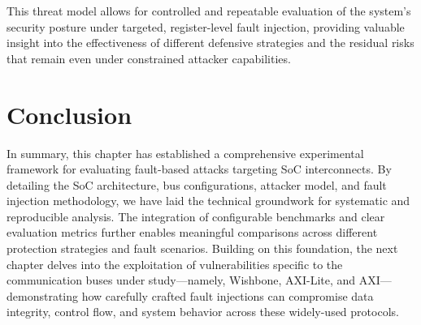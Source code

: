 This threat model allows for controlled and repeatable evaluation of the system’s security posture under targeted, register-level fault injection, providing valuable insight into the effectiveness of different defensive strategies and the residual risks that remain even under constrained attacker capabilities.

\section{Conclusion}
In summary, this chapter has established a comprehensive experimental framework for evaluating fault-based attacks targeting SoC interconnects. By detailing the SoC architecture, bus configurations, attacker model, and fault injection methodology, we have laid the technical groundwork for systematic and reproducible analysis. The integration of configurable benchmarks and clear evaluation metrics further enables meaningful comparisons across different protection strategies and fault scenarios. Building on this foundation, the next chapter delves into the exploitation of vulnerabilities specific to the communication buses under study—namely, Wishbone, AXI-Lite, and AXI—demonstrating how carefully crafted fault injections can compromise data integrity, control flow, and system behavior across these widely-used protocols.
